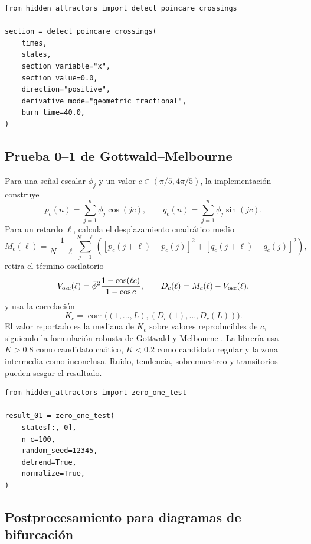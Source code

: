 \begin{verbatim}
from hidden_attractors import detect_poincare_crossings

section = detect_poincare_crossings(
    times,
    states,
    section_variable="x",
    section_value=0.0,
    direction="positive",
    derivative_mode="geometric_fractional",
    burn_time=40.0,
)
\end{verbatim}

\subsection{Prueba 0--1 de Gottwald--Melbourne}

Para una señal escalar \(\phi_j\) y un valor
\(c\in(\pi/5,4\pi/5)\), la implementación construye
\[
 p_c(n)=\sum_{j=1}^{n}\phi_j\cos(jc),\qquad
 q_c(n)=\sum_{j=1}^{n}\phi_j\sin(jc).
\]
Para un retardo \(\ell\), calcula el desplazamiento cuadrático medio
\[
 M_c(\ell)=\frac1{N-\ell}
 \sum_{j=1}^{N-\ell}
 \left([p_c(j+\ell)-p_c(j)]^2+
       [q_c(j+\ell)-q_c(j)]^2\right),
\]
retira el término oscilatorio
\[
 V_{\rm osc}(\ell)=
 \bar\phi^2\frac{1-\cos(\ell c)}{1-\cos c},
 \qquad
 D_c(\ell)=M_c(\ell)-V_{\rm osc}(\ell),
\]
y usa la correlación
\[
 K_c=\operatorname{corr}\bigl((1,\ldots,L),
 (D_c(1),\ldots,D_c(L))\bigr).
\]
El valor reportado es la mediana de \(K_c\) sobre valores reproducibles de
\(c\), siguiendo la formulación robusta de
Gottwald y Melbourne \cite{GottwaldMelbourne2004,GottwaldMelbourne2009}.
La librería usa \(K>0.8\) como candidato caótico, \(K<0.2\) como candidato
regular y la zona intermedia como inconclusa. Ruido, tendencia, sobremuestreo
y transitorios pueden sesgar el resultado.

\begin{verbatim}
from hidden_attractors import zero_one_test

result_01 = zero_one_test(
    states[:, 0],
    n_c=100,
    random_seed=12345,
    detrend=True,
    normalize=True,
)
\end{verbatim}

\subsection{Postprocesamiento para diagramas de bifurcación}

